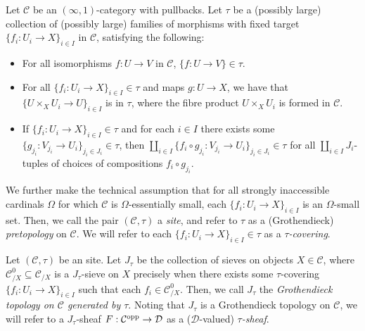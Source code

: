 \documentclass[10pt]{article}
\newcommand{\C}{\mathcal C}
\newcommand{\cD}{\mathcal{D}}
\theoremstyle{witharg}
\theoremstyle{witharg}
\theoremstyle{witharg2}
\begin{document}
\begin{definition}{}\label{higher sites definition}

    Let $\C$ be an $(\infty,1)$-category with pullbacks. Let $\tau$ be a (possibly large) collection of (possibly large) families of morphisms with fixed target $\{f_i:U_i\rightarrow X\}_{i\in I}$ in $\C$, satisfying the following:

    \begin{itemize}


        \item [(1)] For all isomorphisms $f:U\rightarrow V$ in $\C$, $\{f:U\rightarrow V\}\in \tau$. 

        \item [(2)] For all $\{f_i:U_i\rightarrow X\}_{i\in I}\in \tau$ and maps $g:U\rightarrow X$, we have that $\{U\times_XU_i\rightarrow U\}_{i\in I}$ is in $\tau$, where the fibre product $U\times_XU_i$ is formed in $\C$. 

      

        \item [(3)] If $\{f_i:U_i\rightarrow X\}_{i\in I}\in \tau$ and for each $i\in I$ there exists some $\{g_{j_i}:V_{j_i}\rightarrow U_i\}_{j_i\in J_i}\in \tau$, then $\coprod_{i\in I}\{f_i\circ g_{j_i}:V_{j_i}\rightarrow U_i\}_{j_i\in J_i}\in \tau$ for all $\coprod_{i\in I}J_i$-tuples of choices of compositions $f_i\circ g_{j_i}$.

        
    \end{itemize}

   \noindent  We further make the technical assumption that for all strongly inaccessible cardinals $\Omega$ for which $\C$ is $\Omega$-essentially small, each $\{f_i:U_i\rightarrow X\}_{i\in I}$ is an $\Omega$-small set. Then, we call the pair $(\C,\tau)$ a \emph{site}, and refer to $\tau$ as a (Grothendieck) \emph{pretopology} on $\C$. We will refer to each $\{f_i:U_i\rightarrow X\}_{i\in I}\in \tau$ as a \emph{$\tau$-covering}.
    
\end{definition}


\begin{definition}{}\label{Grothendieck topology generated by a site}

    Let $(\C,\tau)$ be an site. Let $J_\tau$ be the collection of sieves on objects $X\in \C$, where $\C^0_{/X}\subseteq \C_{/X}$ is a $J_\tau$-sieve on $X$ precisely when there exists some $\tau$-covering $\{f_i:U_i\rightarrow X\}_{i\in I}$ such that each $f_i\in \C^0_{/X}$. Then, we call $J_\tau$ the \emph{Grothendieck topology on $\C$ generated by $\tau$}. Noting that $J_\tau$ is a Grothendieck topology on $\C$, we will refer to a $J_\tau$-sheaf $F:\C^{\textnormal{opp}}\rightarrow \cD$ as a ($\cD$-valued) \emph{$\tau$-sheaf}. 
    
\end{definition}
\end{document}
